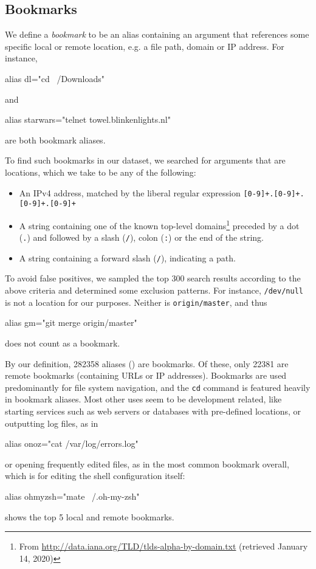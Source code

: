 \subsection{Bookmarks}

We define a \emph{bookmark} to be an alias containing an argument that references some specific local or remote location, e.g. a file path, domain or IP address.
For instance, 
\begin{CVerbatim}
alias dl="cd ~/Downloads"
\end{CVerbatim}
and
\begin{CVerbatim}
alias starwars="telnet towel.blinkenlights.nl"
\end{CVerbatim}
are both bookmark aliases.

To find such bookmarks in our dataset, we searched for arguments that are locations, which we take to be any of the following:
\begin{itemize}
    \item An IPv4 address, matched by the liberal regular expression \verb|[0-9]+.[0-9]+.[0-9]+.[0-9]+|
    \item A string containing one of the known top-level domains\footnote{From \url{http://data.iana.org/TLD/tlds-alpha-by-domain.txt} (retrieved January 14, 2020)} preceded by a dot (\verb|.|) and followed by a slash (\verb|/|), colon (\verb|:|) or the end of the string.
    \item A string containing a forward slash (\verb|/|), indicating a path.
\end{itemize}
To avoid false positives, we sampled the top 300 search results according to the above criteria and determined some exclusion patterns.
For instance, \texttt{/dev/null} is not a location for our purposes.
Neither is \texttt{origin/master}, and thus 
\begin{CVerbatim}
alias gm="git merge origin/master"
\end{CVerbatim}
does not count as a bookmark.

By our definition, \num{282358} aliases () are bookmarks.
Of these, only \num{22381} are remote bookmarks (containing URLs or IP addresses).
Bookmarks are used predominantly for file system navigation, and the \texttt{cd} command is featured heavily in bookmark aliases.
Most other uses seem to be development related, like starting services such as web servers or databases with pre-defined locations, or outputting log files, as in 
\begin{CVerbatim}
alias onoz="cat /var/log/errors.log"
\end{CVerbatim}
or opening frequently edited files, as in the most common bookmark overall, which is for editing the shell configuration itself:
\begin{CVerbatim}
alias ohmyzsh="mate ~/.oh-my-zsh"
\end{CVerbatim}
 shows the top 5 local and remote bookmarks.

